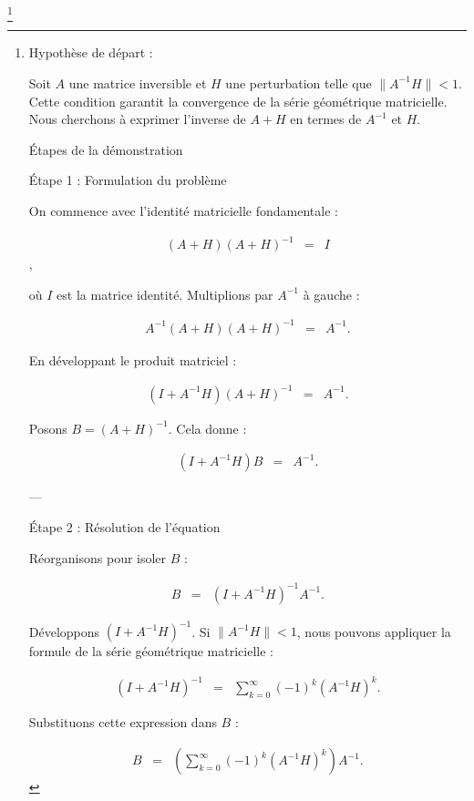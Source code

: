 \footnote{

{\color{magenta}
Hypothèse de départ : 

Soit $A$ une matrice inversible et $H$ une perturbation telle que \( \| A^{-1} H \| < 1 \).  
Cette condition garantit la convergence de la série géométrique matricielle. Nous cherchons à exprimer l’inverse de \( A + H \) en termes de \( A^{-1} \) et \( H \).

Étapes de la démonstration

Étape 1 : Formulation du problème

On commence avec l'identité matricielle fondamentale :

\begin{eqnarray*}
	(A + H)(A + H)^{-1}  &= & I	
\end{eqnarray*}
,


où \( I \) est la matrice identité. Multiplions par \( A^{-1} \) à gauche :

\begin{eqnarray*}
A^{-1}(A + H)(A + H)^{-1} & = & A^{-1}.
\end{eqnarray*}

En développant le produit matriciel :

\begin{eqnarray*}
	(I + A^{-1} H)(A + H)^{-1} &=& A^{-1}.
\end{eqnarray*}

Posons \( B = (A + H)^{-1} \). Cela donne :

\begin{eqnarray*}
	(I + A^{-1} H)B &= &A^{-1}.
\end{eqnarray*}

---

Étape 2 : Résolution de l’équation

Réorganisons pour isoler \( B \) :

\begin{eqnarray*}
	B &=& (I + A^{-1} H)^{-1} A^{-1}.
\end{eqnarray*}

Développons \( (I + A^{-1} H)^{-1} \). Si \( \| A^{-1} H \| < 1 \), nous pouvons appliquer la formule de la série géométrique matricielle :

\begin{eqnarray*}
	(I + A^{-1} H)^{-1}& = &\sum_{k=0}^\infty (-1)^k (A^{-1} H)^k.
\end{eqnarray*}

Substituons cette expression dans \( B \) :

\begin{eqnarray*}
	B &= &\left( \sum_{k=0}^\infty (-1)^k (A^{-1} H)^k \right) A^{-1}.
\end{eqnarray*}

}}
